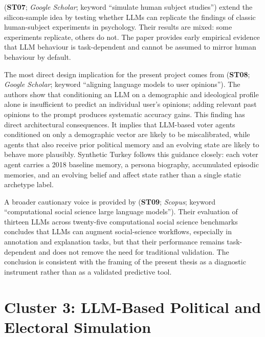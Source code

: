 \documentclass[12pt,a4paper]{report}
\begin{document}
\citet{aher2023simulating} (\textbf{ST07}; \emph{Google Scholar}; keyword \enquote{simulate human subject studies}) extend the silicon-sample idea by testing whether LLMs can replicate the findings of classic human-subject experiments in psychology. Their results are mixed: some experiments replicate, others do not. The paper provides early empirical evidence that LLM behaviour is task-dependent and cannot be assumed to mirror human behaviour by default.

The most direct design implication for the present project comes from \citet{hwang2023aligning} (\textbf{ST08}; \emph{Google Scholar}; keyword \enquote{aligning language models to user opinions}). The authors show that conditioning an LLM on a demographic and ideological profile alone is insufficient to predict an individual user's opinions; adding relevant past opinions to the prompt produces systematic accuracy gains. This finding has direct architectural consequences. It implies that LLM-based voter agents conditioned on only a demographic vector are likely to be miscalibrated, while agents that also receive prior political memory and an evolving state are likely to behave more plausibly. Synthetic Turkey follows this guidance closely: each voter agent carries a 2018 baseline memory, a persona biography, accumulated episodic memories, and an evolving belief and affect state rather than a single static archetype label.

A broader cautionary voice is provided by \citet{ziems2024css} (\textbf{ST09}; \emph{Scopus}; keyword \enquote{computational social science large language models}). Their evaluation of thirteen LLMs across twenty-five computational social science benchmarks concludes that LLMs can augment social-science workflows, especially in annotation and explanation tasks, but that their performance remains task-dependent and does not remove the need for traditional validation. The conclusion is consistent with the framing of the present thesis as a diagnostic instrument rather than as a validated predictive tool.

\section{Cluster 3: LLM-Based Political and Electoral Simulation}
\label{sec:litcluster3}
\end{document}
